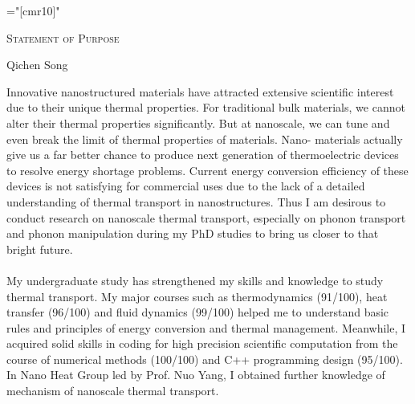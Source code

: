 \documentclass[a4paper,10pt]{article}
\begin{document}
\thispagestyle {empty}
\pagestyle{empty}
\begin{spacing}{1.5}



\font\fb="[cmr10]" %
\begin{center} {  \vspace{5em}  }  \end{center}
\begin{center} {\par\LARGE {\textsc{Statement of Purpose}}     }  \end{center}%
\vspace{0.0em}
\begin{center} {\large {Qichen Song}     }  \end{center}
\vspace{2.0em}
Innovative nanostructured materials have attracted extensive scientific interest due to their unique thermal properties. For traditional bulk materials, we cannot alter their thermal properties significantly. But at nanoscale, we can tune and even break the limit of thermal properties of materials. Nano- materials actually give us a far better chance to produce next generation of thermoelectric devices to resolve energy shortage problems. Current energy conversion efficiency of these devices is not satisfying for commercial uses due to the lack of a detailed understanding of thermal transport in nanostructures. Thus I am desirous to conduct research on nanoscale thermal transport, especially on phonon transport and phonon manipulation during my PhD studies to bring us closer to that bright future.\\
\\
My undergraduate study has strengthened my skills and knowledge to study thermal transport. My major courses such as thermodynamics (91/100), heat transfer (96/100) and fluid dynamics (99/100) helped me to understand basic rules and principles of energy conversion and thermal management. Meanwhile, I acquired solid skills in coding for high precision scientific computation from the course of numerical methods (100/100) and C++ programming design (95/100). In Nano Heat Group led by Prof. Nuo Yang, I obtained further knowledge of mechanism of nanoscale thermal transport.\\

\end{spacing}
\end{document}
